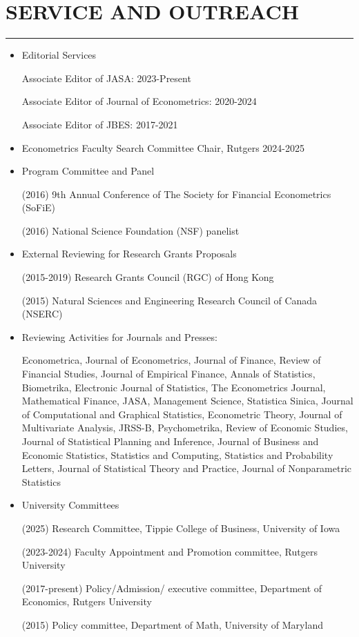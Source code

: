 \documentclass[11pt]{article}
\begin{document}
  \section*{  SERVICE AND OUTREACH}
\hrule
\hfill
\begin{itemize}

\item Editorial Services 

Associate Editor of JASA:  2023-Present 


Associate Editor of Journal of Econometrics:  2020-2024




Associate Editor of JBES:  2017-2021

\item Econometrics Faculty Search Committee Chair, Rutgers 2024-2025

\item Program Committee and Panel

(2016)   9th Annual Conference of The Society for Financial Econometrics (SoFiE)

(2016) National Science Foundation (NSF)  panelist

\item External Reviewing for Research Grants Proposals

(2015-2019)  Research Grants Council (RGC) of Hong Kong

(2015)  Natural Sciences and Engineering Research Council of Canada  (NSERC)


\item Reviewing Activities for Journals and Presses:



  Econometrica, Journal of Econometrics, Journal of Finance, Review of Financial Studies, Journal of Empirical Finance, Annals of Statistics, Biometrika,  Electronic Journal of Statistics, The Econometrics Journal, Mathematical Finance, JASA, Management Science, Statistica Sinica,   Journal of Computational and Graphical Statistics, Econometric Theory, Journal of Multivariate Analysis, JRSS-B, Psychometrika, Review of Economic Studies, Journal of Statistical Planning and Inference, Journal of Business and Economic Statistics, Statistics and Computing, Statistics and Probability Letters, Journal of Statistical Theory and Practice, Journal of Nonparametric Statistics

\item University Committees

 (2025) Research Committee, Tippie College of Business, University of Iowa
 
 
 (2023-2024) Faculty Appointment and Promotion committee, Rutgers University

 
 (2017-present) Policy/Admission/ executive committee, Department of Economics, Rutgers University

 (2015) Policy committee, Department of Math, University of Maryland




\end{itemize}
\end{document}
